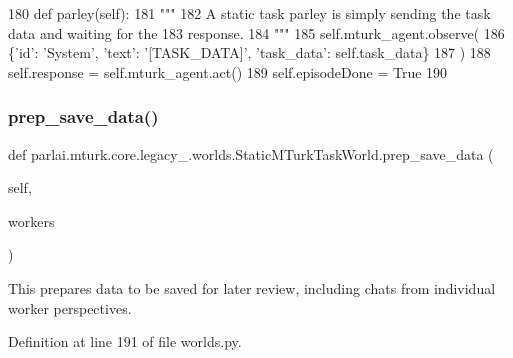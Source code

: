 \begin{DoxyCode}
180     \textcolor{keyword}{def }parley(self):
181         \textcolor{stringliteral}{"""}
182 \textcolor{stringliteral}{        A static task parley is simply sending the task data and waiting for the}
183 \textcolor{stringliteral}{        response.}
184 \textcolor{stringliteral}{        """}
185         self.mturk\_agent.observe(
186             \{\textcolor{stringliteral}{'id'}: \textcolor{stringliteral}{'System'}, \textcolor{stringliteral}{'text'}: \textcolor{stringliteral}{'[TASK\_DATA]'}, \textcolor{stringliteral}{'task\_data'}: self.task\_data\}
187         )
188         self.response = self.mturk\_agent.act()
189         self.episodeDone = \textcolor{keyword}{True}
190 
\end{DoxyCode}
\mbox{\label{classparlai_1_1mturk_1_1core_1_1legacy__2018_1_1worlds_1_1StaticMTurkTaskWorld_a7f263553ea616c3ae36124e5fcab4dc2}} 
\subsubsection{\texorpdfstring{prep\+\_\+save\+\_\+data()}{prep\_save\_data()}}
{\footnotesize\ttfamily def parlai.\+mturk.\+core.\+legacy\+\_.\+worlds.\+Static\+M\+Turk\+Task\+World.\+prep\+\_\+save\+\_\+data (\begin{DoxyParamCaption}\item[{}]{self,  }\item[{}]{workers }\end{DoxyParamCaption})}

\begin{DoxyVerb}This prepares data to be saved for later review, including chats from individual
worker perspectives.
\end{DoxyVerb}
 

Definition at line 191 of file worlds.\+py.


